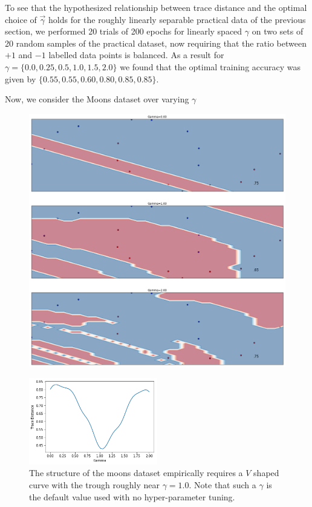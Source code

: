 \documentclass[main.tex]{subfiles}
\begin{document}
To see that the hypothesized relationship between trace distance and the optimal choice of $\vec{\gamma}$ holds for the roughly linearly separable practical data of the previous section, we performed 20 trials of 200 epochs for linearly spaced $\gamma$ on two sets of 20 random samples of the practical dataset, now requiring that the ratio between $+1$ and $-1$ labelled data points is balanced. As a result for $\gamma = \{0.0, 0.25, 0.5, 1.0, 1.5, 2.0\}$ we found that the optimal training accuracy was given by $\{ 0.55, 0.55, 0.60, 0.80, 0.85, 0.85 \}$.

Now, we consider the Moons dataset over varying $\gamma$

\begin{figure}[H]
\centering
\includegraphics[width=\textwidth]{images/moons_gammas}	
\end{figure}

\begin{figure}[H]
\centering
\includegraphics[width=0.5\textwidth]{images/moons_trace_distance}
\caption{The structure of the moons dataset empirically requires a $V$ shaped curve with the trough roughly near $\gamma = 1.0$. Note that such a $\gamma$ is the default value used with no hyper-parameter tuning.}
\end{figure}
\end{document}
